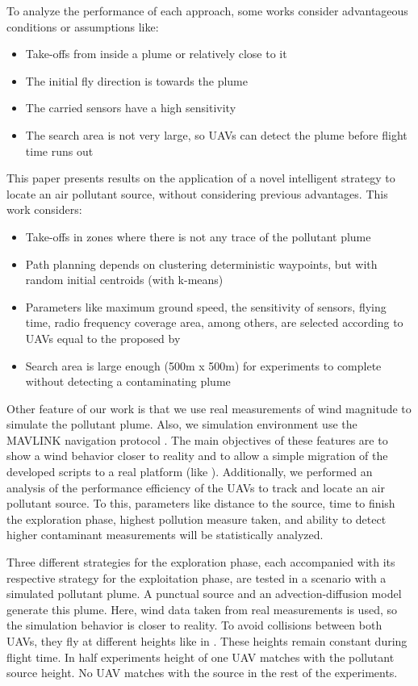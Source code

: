 To analyze the performance of each approach, some works consider advantageous conditions or assumptions like: 
\begin{itemize}
\item Take-offs from inside a plume \cite{vsmidl2013tracking,kristiansen2012operational} or relatively close to it \cite{euler2012cooperative}
\item The initial fly direction is towards the plume \cite{kristiansen2012operational,han2018small} 
\item The carried sensors have a high sensitivity \cite{lee2019dual}
\item The search area is not very large, so UAVs can detect the plume before flight time runs out \cite{fu2019pollution}
\end{itemize}

This paper presents results on the application of a novel intelligent strategy to locate an air pollutant source, without considering previous advantages.
This work considers:
\begin{itemize}
\item Take-offs in zones where there is not any trace of the pollutant plume
\item Path planning depends on clustering deterministic waypoints, but with random initial centroids (with k-means)
\item Parameters like maximum ground speed, the sensitivity of sensors, flying time, radio frequency coverage area, among others, are selected according to UAVs equal to the proposed by \cite{yungaicela2017design}
\item Search area is large enough (500m x 500m) for experiments to complete without detecting a contaminating plume 
\end{itemize}
Other feature of our work is that we use real measurements of wind magnitude to simulate the pollutant plume.
Also, we simulation environment use the MAVLINK navigation protocol \cite{koubaa2019micro}. 
The main objectives of these features are to show a wind behavior closer to reality and to allow a simple migration of the developed scripts to a real platform (like \cite{yungaicela2017design}).
Additionally, we performed an analysis of the performance efficiency of the UAVs to track and locate an air pollutant source. 
To this, parameters like distance to the source, time to finish the exploration phase, highest pollution measure taken, and ability to detect higher contaminant measurements will be statistically analyzed.

Three different strategies for the exploration phase, each accompanied with its respective strategy for the exploitation phase, are tested in a scenario with a simulated pollutant plume. 
A punctual source and an advection-diffusion model generate this plume. Here, wind data taken from real measurements is used, so the simulation behavior is closer to
reality.
To avoid collisions between both UAVs, they fly at different heights like in \cite{viseras2016decentralized}. 
These heights remain constant during flight time.
In half experiments height of one UAV matches with the pollutant source height.
No UAV matches with the source in the rest of the experiments.

